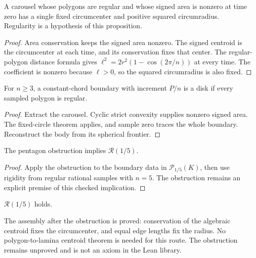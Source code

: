 \begin{proposition}
\label{prop:regular-carousel}
\leanok
{}
A carousel whose polygons are regular and whose signed area is nonzero
at time zero has a single fixed circumcenter and positive squared
circumradius. Regularity is a hypothesis of this proposition.
\end{proposition}
\begin{proof}
\leanok
Area conservation keeps the signed area nonzero. The signed centroid is
the circumcenter at each time, and its conservation fixes that center.
The regular-polygon distance formula gives
$\ell^2=2r^2(1-\cos(2\pi/n))$ at every time. The coefficient is nonzero
because $\ell>0$, so the squared circumradius is also fixed.
\end{proof}

\begin{lemma}
\label{lem:regular-samples-disk}
\leanok
{}
For $n\geq3$, a constant-chord boundary with increment $P/n$ is a disk
if every sampled polygon is regular.
\end{lemma}
\begin{proof}
\leanok
Extract the carousel. Cyclic strict convexity supplies nonzero signed
area. The fixed-circle theorem applies, and sample zero traces the whole
boundary. Reconstruct the body from its spherical frontier.
\end{proof}

\begin{lemma}
\label{lem:fifth-assembly}
\leanok
{}
The pentagon obstruction implies $\mathcal R(1/5)$.
\end{lemma}
\begin{proof}
\leanok
Apply the obstruction to the boundary data in $\mathcal P_{1/5}(K)$,
then use rigidity from regular rational samples with $n=5$.
The obstruction remains an explicit premise of this checked implication.
\end{proof}

\begin{theorem}
\label{thm:fifth}
\notready
{}
$\mathcal R(1/5)$ holds.
\end{theorem}
The assembly after the obstruction is proved: conservation of the algebraic
centroid fixes the circumcenter, and equal edge lengths fix the radius.
No polygon-to-lamina centroid theorem is needed for this route.
The obstruction remains unproved and is not an axiom in the Lean library.

